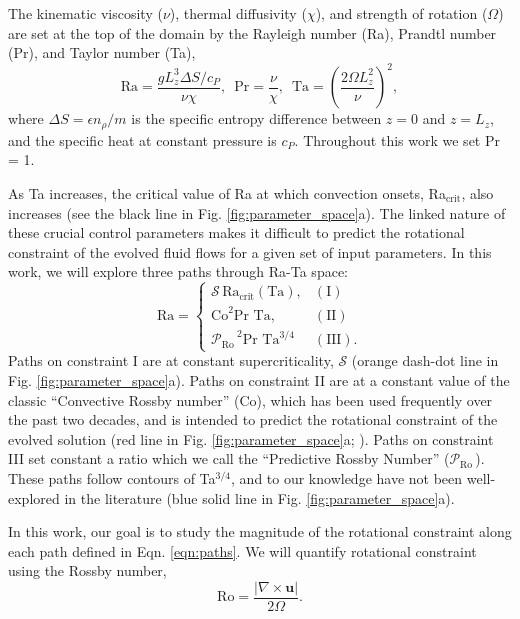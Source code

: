 \documentclass[twocolumn, amsmath, amsfonts, amssymb]{aastex62}
\newcommand{\grad}{\ensuremath{\nabla}}
\newcommand{\pro}{\ensuremath{\mathcal{P}_{\text{Ro}}\,}}
\begin{document}
The kinematic viscosity ($\nu$), thermal diffusivity ($\chi$), and strength of
rotation ($\Omega$) are set at the top of the domain by the Rayleigh number
(Ra), Prandtl number (Pr), and Taylor number (Ta),
\begin{equation}
\text{Ra} = \frac{g L_z^3 \Delta S / c_P}{\nu \chi}, \,\,\,
\text{Pr} = \frac{\nu}{\chi}, \,\,\,
\text{Ta} = \left(\frac{2 \Omega L_z^2}{\nu}\right)^2,
\end{equation}
where $\Delta S = \epsilon n_\rho / m$ is the specific entropy difference between
$z = 0$ and $z = L_z$, and the specific heat at constant pressure is $c_P$.
Throughout this work we set Pr = 1.

As Ta increases, the critical value of Ra at which convection onsets,
Ra$_{\text{crit}}$, also increases (see the black line in Fig. \ref{fig:parameter_space}a). 
The linked nature of these crucial
control parameters makes it difficult to predict the rotational constraint of the evolved
fluid flows for a given set of input parameters. In this work, we will
explore three paths through Ra-Ta space:
\begin{equation}
\text{Ra} = 
\begin{cases}
\mathcal{S}\,\text{Ra}_\text{crit}(\text{Ta}), & (\text{I})\\
\text{Co}^2\text{Pr Ta}, & (\text{II}) \\
\pro^2 \text{Pr Ta}^{3/4} & (\text{III}).
\end{cases}
\label{eqn:paths}
\end{equation}
Paths on constraint I are at constant supercriticality, $\mathcal{S}$
(orange dash-dot line in Fig. \ref{fig:parameter_space}a).
Paths on constraint II are at a constant value of the classic
``Convective Rossby number'' (Co), which has been used frequently over the past
two decades, and is intended to predict the rotational constraint of the
evolved solution (red line in Fig. \ref{fig:parameter_space}a; 
\citet{julien&all1996, brummell&all1996}). Paths on constraint
III set constant a ratio which we call the ``Predictive Rossby Number'' (\pro).
These paths follow contours of Ta$^{3/4}$, and to our knowledge have not been
well-explored in the literature (blue solid line in Fig. \ref{fig:parameter_space}a).  

In this work, our goal is to study the magnitude of the rotational constraint
along each path defined in Eqn. \ref{eqn:paths}. We will quantify rotational
constraint using the Rossby number,
\begin{equation}
\text{Ro} = \frac{|\grad\times \bm{u}|}{2 \Omega}.
\label{eqn:ro}
\end{equation}
\end{document}
